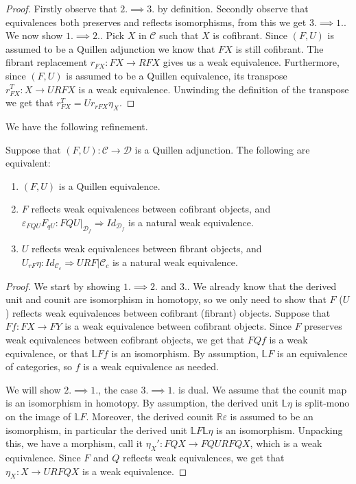 \documentclass[../thesis.tex]{subfiles}
\begin{document}
            \begin{proof}
                Firstly observe that $2.\implies3.$ by definition. Secondly observe that equivalences both preserves and reflects isomorphisms, from this we get $3. \implies 1.$. We now show $1.\implies 2.$. Pick $X$ in $\mathcal{C}$ such that $X$ is cofibrant. Since $(F,U)$ is assumed to be a Quillen adjunction we know that $FX$ is still cofibrant. The fibrant replacement $r_{FX}:FX\rightarrow RFX$ gives us a weak equivalence. Furthermore, since $(F,U)$ is assumed to be a Quillen equivalence, its transpose $r_{FX}^T: X \rightarrow URFX$ is a weak equivalence. Unwinding the definition of the transpose we get that $r_{FX}^T = Ur_{rFX}\eta_X$.

            \end{proof}

            We have the following refinement.

            \begin{corollary}\label{cor: Quill-Eq}
                Suppose that $(F,U):\mathcal{C}\rightarrow\mathcal{D}$ is a Quillen adjunction. The following are equivalent:
                \begin{enumerate}
                    \item $(F,U)$ is a Quillen equivalence.
                    \item $F$ reflects weak equivalences between cofibrant objects, and $\varepsilon_{FQU}F_{qU} : FQU|_{\mathcal{D}_f} \Rightarrow Id_{\mathcal{D}_f}$ is a natural weak equivalence.
                    \item $U$ reflects weak equivalences between fibrant objects, and $U_{rF}\eta : Id_{\mathcal{C}_c} \Rightarrow URF|{\mathcal{C}_c}$ is a natural weak equivalence.
                \end{enumerate}
            \end{corollary}

            \begin{proof}
                We start by showing $1. \implies 2.$ and $3.$. We already know that the derived unit and counit are isomorphism in homotopy, so we only need to show that $F$ ($U$) reflects weak equivalences between cofibrant (fibrant) objects. Suppose that $Ff:FX\rightarrow FY$ is a weak equivalence between cofibrant objects. Since $F$ preserves weak equivalences between cofibrant objects, we get that $FQf$ is a weak equivalence, or that $\mathbb{L}Ff$ is an isomorphism. By assumption, $\mathbb{L}F$ is an equivalence of categories, so $f$ is a weak equivalence as needed.

                We will show $2.\implies 1.$, the case $3.\implies 1.$ is dual. We assume that the counit map is an isomorphism in homotopy. By assumption, the derived unit $\mathbb{L}\eta$ is split-mono on the image of $\mathbb{L}F$. Moreover, the derived counit $\mathbb{R}\varepsilon$ is assumed to be an isomorphism, in particular the derived unit $\mathbb{L}F\mathbb{L}\eta$ is an isomorphism. Unpacking this, we have a morphism, call it $\eta_X' : FQX \rightarrow FQURFQX$, which is a weak equivalence. Since $F$ and $Q$ reflects weak equivalences, we get that $\eta_X: X \rightarrow URFQX$ is a weak equivalence.
            \end{proof}
\end{document}

